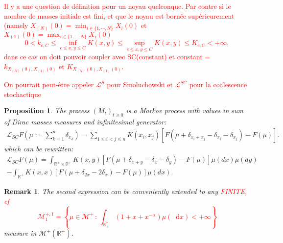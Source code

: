 \documentclass[11pt,a4paper]{article}
\newcommand{\RR}{\mathbb{R}}
\newcommand{\MC}{\mathcal{M}}
\newcommand{\LC}{\mathcal{L}}
\newcommand{\red}[1]{\textcolor{red}{#1}}
\newcommand{\Proc}[1]{\left(#1\right)_{t\geq 0}}
\newcommand{\dd}{\mathop{}\!\mathrm{d}}
\newtheorem{remark}[theorem]{Remark}
\newtheorem{proposition}[theorem]{Proposition}
\begin{document}
\red{Il y a une question de définition pour un noyau quelconque. Par contre si le nombre de masses initiale est fini, et que le noyau est bornée supérieurement (namely $X_{(N)}(0) = \min_{i\in\{1,\cdots,N\}} X_i(0)$ et $X_{(1)}(0)=\max_{i\in\{1,\cdots,N\}} X_i(0)$
\[0<k_{c,C} \le \inf_{c\le x,y\le C} K(x,y) \le \sup_{c\le x,y  \le C}K(x,y) \le K_{c,C} < +\infty,\]
dans ce cas on doit pouvoir coupler avec SC(constant) et constant = $k_{X_{(N)}(0),X_{(1)}(0)}$ et $K_{X_{(N)}(0),X_{(1)}(0)}$. 
}

\red{On pourrait peut-être appeler  $\mathcal{L}^S$ pour Smoluchowski et $\LC^{SC}$ pour la coalescence stochactique}

\begin{proposition}
    The process $\Proc{M_t}$ is a Markov process with values in sum of Dirac masses measures and infinitesimal generator:
    \begin{align*}
        \LC_{SC} F\left(\mu := \sum\limits_{k = 1}^n\delta_{x_k} \right) = \sum\limits_{1\le i <j \le n} K(x_i,x_j) \left[F\left(\mu + \delta_{x_i + x_j} - \delta_{x_i} -\delta_{x_j}\right) - F(\mu)\right].
    \end{align*}
    which can be rewritten:
    \begin{multline*}
        \LC_{SC} F(\mu) = \int_{\RR^+ \times \RR^+} K(x,y)\left[ F\left(\mu + \delta_{x+y} - \delta_x - \delta_y \right) - F(\mu) \right]\mu(dx)\mu(dy) \\
        -\int_{\RR^+} K(x,x)\left[ F\left(\mu + \delta_{2x} - 2\delta_x \right) - F(\mu) \right]\mu(dx).
    \end{multline*}
\end{proposition}
\begin{remark}
    The second expression can be conveniently extended to any \red{FINITE, cf \[\mathcal{M}^{+,1}_1 = \left\{\mu \in \MC^+\, : \, \int_{\mathbb{R}_+^*} (1 + x + x^{-\alpha})\mu(\dd x) <+\infty\right\}\]} measure in $\MC^+(\RR^+)$.
\end{remark}
\end{document}
